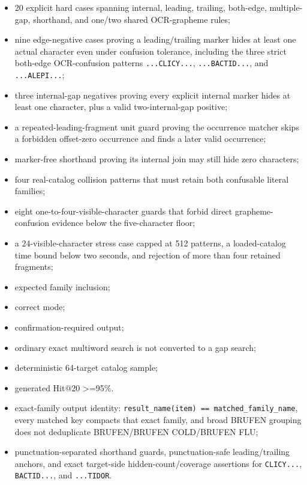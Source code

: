 \begin{itemize}
\tightlist
\item
  20 explicit hard cases spanning internal, leading, trailing, both-edge, multiple-gap, shorthand, and one/two shared OCR-grapheme rules;
\item
  nine edge-negative cases proving a leading/trailing marker hides at least one actual character even under confusion tolerance, including the three strict both-edge OCR-confusion patterns \texttt{...CLICY...}, \texttt{...BACTID...}, and \texttt{...ALEPI...};
\item
  three internal-gap negatives proving every explicit internal marker hides at least one character, plus a valid two-internal-gap positive;
\item
  a repeated-leading-fragment unit guard proving the occurrence matcher skips a forbidden offset-zero occurrence and finds a later valid occurrence;
\item
  marker-free shorthand proving its internal join may still hide zero characters;
\item
  four real-catalog collision patterns that must retain both confusable literal families;
\item
  eight one-to-four-visible-character guards that forbid direct grapheme-confusion evidence below the five-character floor;
\item
  a 24-visible-character stress case capped at 512 patterns, a loaded-catalog time bound below two seconds, and rejection of more than four retained fragments;
\item
  expected family inclusion;
\item
  correct mode;
\item
  confirmation-required output;
\item
  ordinary exact multiword search is not converted to a gap search;
\item
  deterministic 64-target catalog sample;
\item
  generated Hit@20 \textgreater=95\%.
\item
  exact-family output identity: \texttt{result\_\allowbreak{}name(item)\ ==\ matched\_\allowbreak{}family\_\allowbreak{}name}, every matched key compacts that exact family, and broad BRUFEN grouping does not deduplicate BRUFEN/BRUFEN COLD/BRUFEN FLU;
\item
  punctuation-separated shorthand guards, punctuation-safe leading/trailing
  anchors, and exact target-side hidden-count/coverage assertions for
  \texttt{CLICY...}, \texttt{BACTID...}, and \texttt{...TIDOR}.
\end{itemize}

